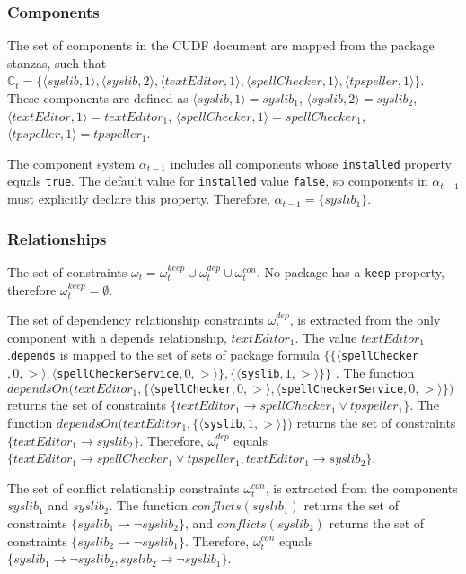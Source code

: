 \subsubsection{Components}
The set of components in the CUDF document are mapped from the package stanzas,
such that $\mathbb{C}_t = \{\langle syslib,1 \rangle, \langle syslib,2\rangle,  \langle textEditor,1 \rangle,  \langle spellChecker,1 \rangle,  \langle tpspeller,1 \rangle\}$.
These components are defined as
$\langle syslib,1 \rangle = syslib_1$, $\langle syslib,2\rangle = syslib_2 $,  $\langle textEditor,1 \rangle =  textEditor_1 $,  
$\langle spellChecker,1 \rangle =  spellChecker_1 $,  $\langle tpspeller,1 \rangle =  tpspeller_1 $.

The component system $\alpha_{t-1}$ includes all components whose \verb+installed+ property equals \verb+true+.
The default value for \verb+installed+ value \verb+false+, so components in $\alpha_{t-1}$ must explicitly declare this property.
Therefore, $\alpha_{t-1} = \{ syslib_1 \}$.

\subsubsection{Relationships}
The set of constraints $\omega_t = \omega_t^{keep} \cup \omega_t^{dep} \cup \omega_t^{con}$.
No package has a \texttt{keep} property, therefore $\omega_t^{keep} = \emptyset$.


The set of dependency relationship constraints $\omega_t^{dep}$, is extracted from the only component with a depends relationship, $textEditor_1$.
The value $textEditor_1$.\texttt{depends} is mapped to the set of sets of package formula $\{\{\langle $\verb+spellChecker+$,0,>\rangle,\langle $\verb+spellCheckerService+$,0,>\rangle\},\{\langle $\verb+syslib+$,1,>\rangle\}\}$ .
The function $dependsOn(textEditor_1 , \{\langle $\verb+spellChecker+$,0,>\rangle,\langle $\verb+spellCheckerService+$,0,>\rangle\} )$
returns the set of constraints $\{textEditor_1 \rightarrow spellChecker_1 \vee tpspeller_1\}$.
The function $dependsOn(textEditor_1 , \{\langle $\verb+syslib+$,1,>\rangle\} )$
returns the set of constraints  $\{textEditor_1 \rightarrow syslib_2\}$.
Therefore, $\omega_t^{dep}$ equals $\{textEditor_1 \rightarrow spellChecker_1 \vee tpspeller_1 , textEditor_1 \rightarrow syslib_2\}$.

The set of conflict relationship constraints $\omega_t^{con}$, is extracted from the components $syslib_1$ and $syslib_2$.
The function $conflicts(syslib_1)$ returns the set of constraints $\{syslib_1 \rightarrow \neg syslib_2\}$,
and  $conflicts(syslib_2)$ returns the set of constraints $\{syslib_2 \rightarrow \neg syslib_1\}$.
Therefore, $\omega_t^{con}$ equals $\{syslib_1 \rightarrow \neg syslib_2, syslib_2 \rightarrow \neg syslib_1\}$.

